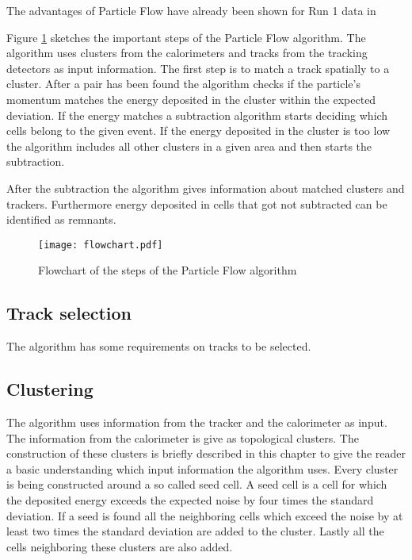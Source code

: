 The advantages of Particle Flow have already been shown for Run 1 data in

Figure \ref{fig:pflowflowchart} sketches the important steps of the Particle Flow algorithm. The algorithm uses clusters from the calorimeters and tracks from the tracking detectors as input information. The first step is to match a track spatially to a cluster. After a pair has been found the algorithm checks if the particle's momentum matches the energy deposited in the cluster within the expected deviation. If the energy matches a subtraction algorithm starts deciding which cells belong to the given event. If the energy deposited in the cluster is too low the algorithm includes all other clusters in a given area and then starts the subtraction.

After the subtraction the algorithm gives information about matched clusters and trackers. Furthermore energy deposited in cells that got not subtracted can be identified as remnants. 

\begin{figure}[h]
  \centering
  \texttt{[image: flowchart.pdf]}
  \caption[Flowchart of the steps of the Particle Flow algorithm]{Flowchart of the steps of the Particle Flow algorithm}
  \label{fig:pflowflowchart}
\end{figure}

\subsection{Track selection}

The algorithm has some requirements on tracks to be selected. 



\subsection{Clustering}

The algorithm uses information from the tracker and the calorimeter as input. The information from the calorimeter is give as topological clusters. The construction of these clusters is briefly described in this chapter to give the reader a basic understanding which input information the algorithm uses.
Every cluster is being constructed around a so called seed cell. A seed cell is a cell for which the deposited energy exceeds the expected noise by four times the standard deviation. If a seed is found all the neighboring cells which exceed the noise by at least two times the standard deviation are added to the cluster. Lastly all the cells neighboring these clusters are also added.


